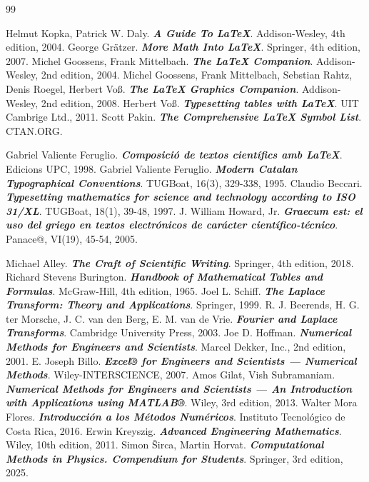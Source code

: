 \begin{thebibliography}{99}


     Helmut Kopka, Patrick W. Daly. \textbf{\textit{A Guide To \LaTeX}}.  Addison-Wesley, 4th edition, 2004.
     George Grätzer. \textbf{\textit{More Math Into \LaTeX}}.  Springer, 4th edition, 2007.
     Michel Goossens, Frank Mittelbach. \textbf{\textit{The \LaTeX{} Companion}}.  Addison-Wesley, 2nd edition, 2004.
     Michel Goossens, Frank Mittelbach, Sebstian Rahtz, Denis Roegel, Herbert Voß. \textbf{\textit{The \LaTeX{} Graphics Companion}}.  Addison-Wesley, 2nd edition, 2008.
     Herbert Voß. \textbf{\textit{Typesetting tables with \LaTeX{}}}.  UIT Cambrige Ltd., 2011.
     Scott Pakin. \textbf{\textit{The Comprehensive \LaTeX{} Symbol List}}. CTAN.ORG.

     Gabriel Valiente Feruglio. \textbf{\textit{Composició de textos científics amb \LaTeX}}.  Edicions UPC, 1998.
     Gabriel Valiente Feruglio. \textbf{\textit{Modern Catalan Typographical Conventions}}.  TUGBoat, 16(3), 329-338, 1995.
     Claudio Beccari. \textbf{\textit{Typesetting mathematics for science and technology according to ISO 31/XL}}.  TUGBoat, 18(1), 39-48, 1997.
     J. William Howard, Jr. \textbf{\textit{Graecum est: el uso del griego en textos electrónicos de carácter científico-técnico}}.  Panace@, VI(19), 45-54, 2005.

	 Michael Alley. \textbf{\textit{The Craft of Scientific Writing}}. Springer, 4th edition, 2018.
     Richard Stevens Burington. \textbf{\textit{Handbook of Mathematical Tables and Formulas}}.  McGraw-Hill, 4th edition, 1965.
     Joel L. Schiff. \textbf{\textit{The Laplace Transform: Theory and Applications}}.  Springer, 1999.
     R. J. Beerends, H. G. ter Morsche, J. C. van den Berg, E. M. van de Vrie. \textbf{\textit{Fourier and Laplace Transforms}}.  Cambridge University Press, 2003.
     Joe D. Hoffman. \textbf{\textit{Numerical Methods for Engineers and Scientists}}.  Marcel Dekker, Inc., 2nd edition, 2001.
     E. Joseph Billo. \textbf{\textit{Excel® for Engineers and Scientists --- Numerical Methods}}.  Wiley-INTERSCIENCE, 2007.
     Amos Gilat, Vish Subramaniam. \textbf{\textit{Numerical Methods for Engineers and Scientists ---
        An Introduction with Applications using MATLAB®}}.  Wiley, 3rd edition, 2013.
     Walter Mora Flores. \textbf{\textit{Introducción a los Métodos Numéricos}}.  Instituto Tecnológico de Costa Rica, 2016.
      Erwin Kreyszig. \textbf{\textit{Advanced Engineering Mathematics}}.  Wiley, 10th edition, 2011.
      Simon Širca, Martin Horvat. \textbf{\textit{Computational Methods in Physics. Compendium for Students}}. Springer, 3rd edition, 2025.


\end{thebibliography}
